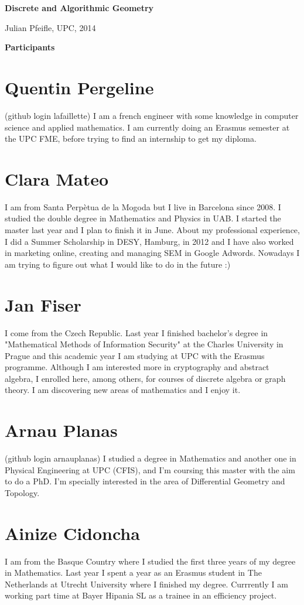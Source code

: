 \documentclass[11pt]{amsart}
\begin{document}
\begin{center}
\textbf{\sffamily
   Discrete and Algorithmic Geometry }

\medskip
   Julian Pfeifle,
   UPC, 2014 \mbox{}
\end{center}

\bigskip

\begin{center}
  \textbf{\sffamily Participants}
\end{center}


\section*{Quentin Pergeline}
(github login lafaillette) I am a french engineer with some knowledge in computer science and applied mathematics.
I am currently doing an Erasmus semester at the UPC FME, before trying to find an internship to get my diploma.

\section*{Clara Mateo}
I am from Santa Perp\`etua de la Mogoda but I live in Barcelona since 2008. I studied the double degree in Mathematics and Physics in UAB. I started the master last year and I plan to finish it in June. About my professional experience, I did a Summer Scholarship in DESY, Hamburg, in 2012 and I have also worked in marketing online, creating and managing SEM in Google Adwords. Nowadays I am trying to figure out what I would like to do in the future :)


\section*{Jan Fiser}
I come from the Czech Republic. Last year I finished bachelor's degree in "Mathematical Methods of Information Security" at the Charles University in Prague and this academic year I am studying at UPC with the Erasmus programme.
Although I am interested more in cryptography and abstract algebra, I enrolled here, among others, for courses of discrete algebra or graph theory. I am discovering new areas of mathematics and I enjoy it.


\section*{Arnau Planas}
(github login arnauplanas) I studied a degree in Mathematics and another one in Physical Engineering at UPC (CFIS), 
and I'm coursing this master with the aim to do a PhD. 
I'm specially interested in the area of Differential Geometry and Topology.

\section*{Ainize Cidoncha}
I am from the Basque Country where I studied the first three years of my degree in Mathematics. Last year I spent a year as an Erasmus student in The Netherlands at Utrecht University where I finished my degree. 
Currrently I am working part time at Bayer Hipania SL as a trainee in an efficiency project.
\end{document}
